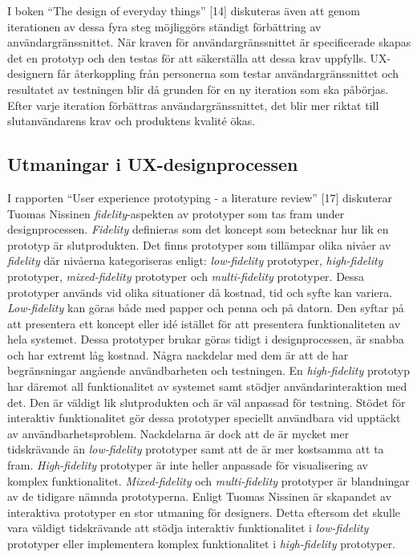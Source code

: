 \documentclass[12pt]{kththesis}
\begin{document}
I boken “The design of everyday things” [14] diskuteras även att genom iterationen av dessa fyra steg möjliggörs ständigt förbättring av användargränssnittet. När kraven för användargränssnittet är specificerade skapas det en prototyp och den testas för att säkerställa att dessa krav uppfylls. UX-designern får återkoppling från personerna som testar användargränssnittet och resultatet av testningen blir då grunden för en ny iteration som ska påbörjas. Efter varje iteration förbättras användargränssnittet, det blir mer riktat till slutanvändarens krav och produktens kvalité ökas.

\subsection{Utmaningar i UX-designprocessen}

I rapporten “User experience prototyping - a literature review” [17] diskuterar Tuomas Nissinen \textit{fidelity}-aspekten av prototyper som tas fram under designprocessen. \textit{Fidelity} definieras som det koncept som betecknar hur lik en prototyp är slutprodukten. Det finns prototyper som tillämpar olika nivåer av \textit{fidelity} där nivåerna kategoriseras enligt: \textit{low-fidelity} prototyper, \textit{high-fidelity} prototyper, \textit{mixed-fidelity} prototyper och \textit{multi-fidelity} prototyper. Dessa prototyper används vid olika situationer då kostnad, tid och syfte kan variera. \textit{Low-fidelity} kan göras både med papper och penna och på datorn. Den syftar på att presentera ett koncept eller idé istället för att presentera funktionaliteten av hela systemet. Dessa prototyper brukar göras tidigt i designprocessen, är snabba och har extremt låg kostnad. Några nackdelar med dem är att de har begränsningar angående användbarheten och testningen. En \textit{high-fidelity} prototyp har däremot all funktionalitet av systemet samt stödjer användarinteraktion med det. Den är väldigt lik slutprodukten och är väl anpassad för testning. Stödet för interaktiv funktionalitet gör dessa prototyper speciellt användbara vid upptäckt av användbarhetsproblem. Nackdelarna är dock att de är mycket mer tidskrävande än \textit{low-fidelity} prototyper samt att de är mer kostsamma att ta fram. \textit{High-fidelity} prototyper är inte heller anpassade för visualisering av komplex funktionalitet. \textit{Mixed-fidelity} och \textit{multi-fidelity} prototyper är blandningar av de tidigare nämnda prototyperna. Enligt Tuomas Nissinen är skapandet av interaktiva prototyper en stor utmaning för designers. Detta eftersom det skulle vara väldigt tidskrävande att stödja interaktiv funktionalitet i \textit{low-fidelity} prototyper eller implementera komplex funktionalitet i \textit{high-fidelity} prototyper.
\end{document}

